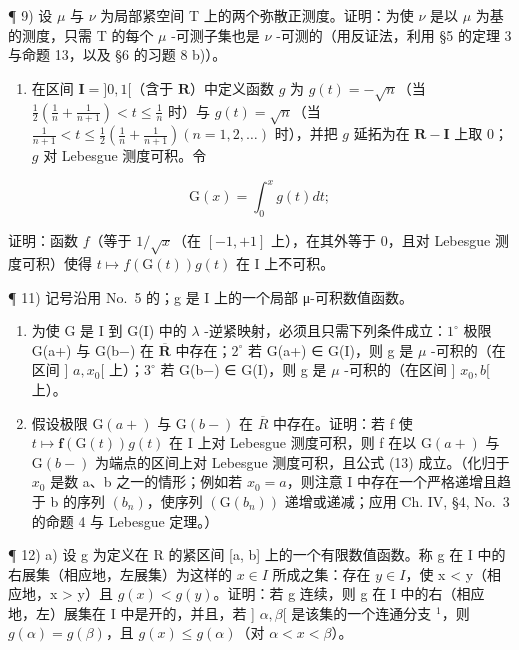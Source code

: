 ¶ 9) 设 \(\mu\) 与 \(\nu\) 为局部紧空间 T 上的两个弥散正测度。证明：为使 \(\nu\) 是以 \(\mu\) 为基的测度，只需 T 的每个 \(\mu\) -可测子集也是 \(\nu\) -可测的（用反证法，利用 §5 的定理 3 与命题 13，以及 §6 的习题 8 b)）。

\begin{enumerate}
\def\labelenumi{\arabic{enumi})}
\setcounter{enumi}{9}
\tightlist
\item
  在区间 \(\mathbf{I} = ]0,1[\)（含于 \(\mathbf{R}\)）中定义函数 \(g\) 为 \(g(t) = -\sqrt{n}\)（当 \(\frac{1}{2}\left(\frac{1}{n} + \frac{1}{n+1}\right) < t \leqslant \frac{1}{n}\) 时）与 \(g(t) = \sqrt{n}\)（当 \(\frac{1}{n+1} < t \leqslant \frac{1}{2}\left(\frac{1}{n} + \frac{1}{n+1}\right) (n = 1,2,\ldots)\) 时），并把 \(g\) 延拓为在 \(\mathbf{R} - \mathbf{I}\) 上取 0；\(g\) 对 Lebesgue 测度可积。令
\end{enumerate}

\[
\mathrm{G} (x) = \int_ {0} ^ {x} g (t) d t;
\]

证明：函数 \(f\)（等于 \(1 / \sqrt{x}\)（在 \([-1, +1]\) 上），在其外等于 0，且对 Lebesgue 测度可积）使得 \(t \mapsto f(\mathrm{G}(t))g(t)\) 在 I 上不可积。

¶ 11) 记号沿用 No.~5 的；g 是 I 上的一个局部 μ-可积数值函数。

\begin{enumerate}
\def\labelenumi{\alph{enumi})}
\item
  为使 G 是 I 到 G(I) 中的 \(\lambda\) -逆紧映射，必须且只需下列条件成立：\(1^{\circ}\) 极限 G(a+) 与 G(b−) 在 \(\overline{\mathbf{R}}\) 中存在；\(2^{\circ}\) 若 G(a+) ∈ G(I)，则 g 是 \(\mu\) -可积的（在区间 {]} \(a, x_0[\) 上）；\(3^{\circ}\) 若 G(b−) ∈ G(I)，则 g 是 \(\mu\) -可积的（在区间 {]} \(x_0, b[\) 上）。
\item
  假设极限 \(\mathrm{G}(a+)\) 与 \(\mathrm{G}(b-)\) 在 \(\overline{R}\) 中存在。证明：若 f 使 \(t \mapsto \mathbf{f}(\mathrm{G}(t))g(t)\) 在 I 上对 Lebesgue 测度可积，则 f 在以 \(\mathrm{G}(a+)\) 与 \(\mathrm{G}(b-)\) 为端点的区间上对 Lebesgue 测度可积，且公式 (13) 成立。（化归于 \(x_{0}\) 是数 a、b 之一的情形；例如若 \(x_{0} = a\)，则注意 I 中存在一个严格递增且趋于 b 的序列 \((b_{n})\)，使序列 \((\mathrm{G}(b_{n}))\) 递增或递减；应用 Ch. IV, §4, No.~3 的命题 4 与 Lebesgue 定理。）
\end{enumerate}

¶ 12) a) 设 g 为定义在 R 的紧区间 {[}a, b{]} 上的一个有限数值函数。称 g 在 I 中的右展集（相应地，左展集）为这样的 \(x \in I\) 所成之集：存在 \(y \in I\)，使 x < y（相应地，x \textgreater{} y）且 \(g(x) < g(y)\)。证明：若 g 连续，则 g 在 I 中的右（相应地，左）展集在 I 中是开的，并且，若 {]} \(\alpha, \beta[\) 是该集的一个连通分支 \(^{1}\)，则 \(g(\alpha) = g(\beta)\)，且 \(g(x) \leqslant g(\alpha)\)（对 \(\alpha < x < \beta\)）。

